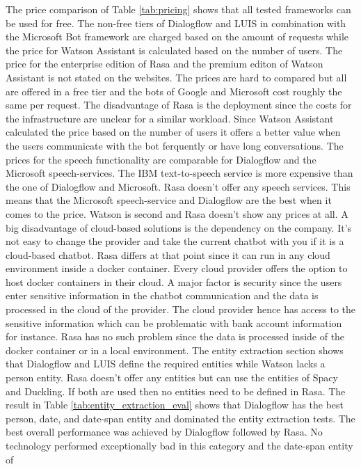 The price comparison of Table \ref{tab:pricing} shows that all 
tested frameworks can be used for free.
The non-free tiers of Dialogflow and LUIS in combination with the Microsoft Bot framework 
are charged based on the amount of requests while the price for Watson Assistant
is calculated based on the number of users.
The price for the enterprise edition of Rasa and the premium editon of Watson Assistant 
is not stated on the websites.
The prices are hard to compared but all are offered in a free tier and the 
bots of Google and Microsoft cost roughly the same per request. 
The disadvantage of Rasa is the deployment since the costs for the infrastructure are unclear 
for a similar workload.
Since Watson Assistant calculated the price based on the number of users it offers a better 
value when the users communicate with the bot ferquently or have long conversations.
The prices for the speech functionality are comparable for Dialogflow and the Microsoft speech-services.
The IBM text-to-speech service is more expensive than the one of Dialogflow and Microsoft.
Rasa doesn't offer any speech services.
This means that the Microsoft speech-service and Dialogflow are the best when it comes to the 
price. Watson is second and Rasa doesn't show any prices at all.
A big disadvantage of cloud-based solutions is the dependency on the company.
It's not easy to change the provider and take the current chatbot with you if it 
is a cloud-based chatbot. 
Rasa differs at that point since it can run in any cloud environment inside a docker container.
Every cloud provider offers the option to host docker containers in their cloud.
A major factor is security since the users enter sensitive information in the chatbot communication
and the data is processed in the cloud of the provider.
The cloud provider hence has access to the sensitive information which can be problematic with
bank account information for instance.
Rasa has no such problem since the data is processed inside of the docker container or in a 
local environment.
The entity extraction section shows that Dialogflow and LUIS 
define the required entities while Watson lacks a person entity.
Rasa doesn't offer any entities but can use the entities of 
Spacy and Duckling.
If both are used then no entities need to be defined in Rasa.
The result in Table \ref{tab:entity_extraction_eval} shows that 
Dialogflow has the best person, date, and date-span entity and dominated the 
entity extraction tests.
The best overall performance was achieved by Dialogflow followed by Rasa.
No technology performed exceptionally bad in this category and the date-span entity of 
